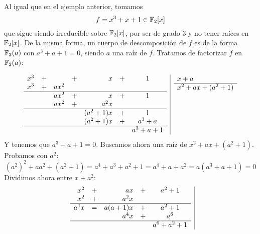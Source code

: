 \begin{ejemplo}
    Al igual que en el ejemplo anterior, tomamos
    \begin{equation*}
        f = x^3+x+1 \in \mathbb{F}_2[x]
    \end{equation*}
    que sigue siendo irreducible sobre $\mathbb{F}_2[x]$, por ser de grado 3 y no tener raíces en $\mathbb{F}_2[x]$. De la misma forma, un cuerpo de descomposición de $f$ es de la forma $\mathbb{F}_2(a)$ con $a^3+a+1=0$, siendo $a$ una raíz de $f$. Tratamos de factorizar $f$ en $\mathbb{F}_2(a)$:

    \begin{equation*}
        \begin{array}{r|c}
            \begin{array}{rcrcrcc}
                x^3&+&&+&x&+&1 \\
                x^3&+&ax^2 && &&\\
                \hline
                   &&ax^2&+&x&+&1  \\
                   &&ax^2&+&a^2x&& \\
                   \hline
                   &&&&(a^2 +1)x &+&1 \\
                   &&&&(a^2+1)x &+&a^3 + a \\
                   \hline
                   &&&&&& a^3 + a + 1
            \end{array} & 
            \begin{array}{l}
                x+a \\
                \hline
                x^2+ax+(a^2+1) \\ \\ \\ \\ \\ \\
            \end{array}
        \end{array}
    \end{equation*}
    Y tenemos que $a^3+a+1 = 0$. Buscamos ahora una raíz de $x^2+ax+(a^2+1)$. Probamos con $a^2$:
    \begin{equation*}
        {\left(a^2\right)}^{2}+ aa^2 + (a^2+1) = a^4 + a^3 + a^2 + 1 = a^4 + a + a^2 = a(a^3 + a + 1) = 0
    \end{equation*}
    Dividimos ahora entre $x+a^2$:
    \begin{equation*}
        \begin{array}{r|c}
            \begin{array}{rcrcc}
                x^2 &+& ax &+& a^2 +1 \\
                x^2 &+& a^2 x && \\
                \hline
                     a^4x &=& a(a+1)x &+& a^2 + 1 \\
                          && a^4x &+& a^6 \\
                          \hline
                          &&&& a^6+a^2 +1


\end{array}
\end{array}
\end{equation*}
\end{ejemplo}
